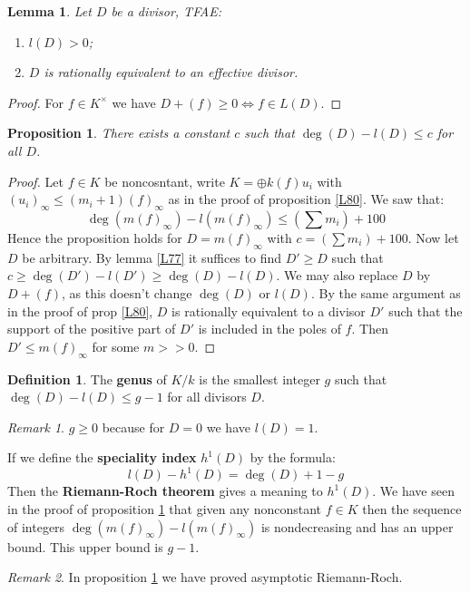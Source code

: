 \documentclass{article}
\theoremstyle{plain}
\newtheorem{lem}[thm]{Lemma}
\newtheorem{prop}[thm]{Proposition}
\theoremstyle{definition}
\newtheorem{defn}{Definition}
\theoremstyle{remark}
\newtheorem*{rem}{Remark}
\begin{document}
\begin{lem}
\label{L82}
Let $D$ be a divisor, TFAE:
\begin{enumerate}
\item $l(D)>0$;
\item $D$ is rationally equivalent to an effective divisor.
\end{enumerate}
\end{lem}
\begin{proof}
For $f\in K^{\times}$ we have $D+(f) \geq 0 \Leftrightarrow f \in L(D)$.
\end{proof}

\begin{prop}
\label{L83}
There exists a constant $c$ such that $\deg(D) - l(D) \leq c$ for all $D$.
\end{prop}
\begin{proof}
Let $f\in K$ be noncosntant, write $K = \oplus k(f) u_i$ with $(u_i)_{\infty} \leq (m_i + 1) (f)_{\infty}$ as in the proof of proposition \ref{L80}. We saw that:
\[     \deg(m(f)_{\infty}) - l(m (f)_{\infty}) \leq (\sum m_i) + 100   \]
Hence the proposition holds for $D = m(f)_{\infty}$ with $c = (\sum m_i) + 100$. Now let $D$ be arbitrary. By lemma \ref{L77} it suffices to find $D' \geq D$ such that $c\geq \deg(D') - l(D') \geq \deg(D) - l(D)$. We may also replace $D$ by $D + (f)$, as this doesn't change $\deg(D)$ or $l(D)$. By the same argument as in the proof of prop \ref{L80}, $D$ is rationally equivalent to a divisor $D'$ such that the support of the positive part of $D'$ is included in the poles of $f$. Then $D' \leq m(f)_{\infty}$ for some $m>>0$.
\end{proof}

\begin{defn}
The \textbf{genus} of $K/k$ is the smallest integer $g$ such that $\deg(D) - l(D) \leq g-1$ for all divisors $D$.
\end{defn}
\begin{rem}
$g\geq 0$ because for $D=0$ we have $l(D) = 1$.
\end{rem}
If we define the \textbf{speciality index} $h^1(D)$ by the formula:
\[      l(D) - h^1(D) = \deg(D) + 1 -g     \]
Then the \textbf{Riemann-Roch theorem} gives a meaning to $h^1(D)$. We have seen in the proof of proposition \ref{L83} that given any nonconstant $f\in K$ then the sequence of integers $\deg(m(f)_{\infty}) - l(m(f)_{\infty})$ is nondecreasing and has an upper bound. This upper bound is $g-1$.
\begin{rem}
In proposition \ref{L83} we have proved asymptotic Riemann-Roch.
\end{rem}
\end{document}
